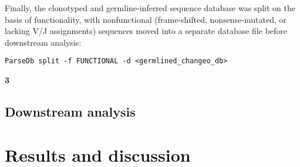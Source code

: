 Finally, the clonotyped and germline-inferred sequence database was split on the basis of functionality, with nonfunctional (frame-shifted, nonsense-mutated, or lacking V/J assignments) sequences moved into a separate database file before downstream analysis:

\begin{lstlisting}
ParseDb split -f FUNCTIONAL -d <germlined_changeo_db>
\end{lstlisting}\textbf{3}

\subsection{Downstream analysis}

\section{Results and discussion}




